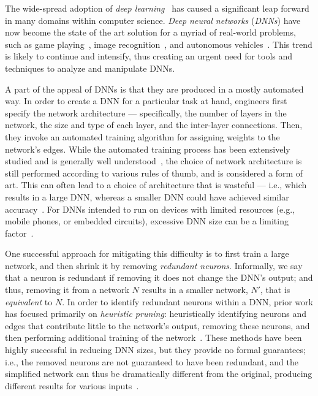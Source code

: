 \documentclass[10pt, conference, twocolumn, compsocconf]{IEEEtran}
\theoremstyle{remark}
\begin{document}
The wide-spread adoption of \emph{deep learning}~\cite{GoBeCo16} has
caused a significant leap forward in many domains within computer
science.  \emph{Deep neural networks} (\emph{DNNs}) have now become
the state of the art solution for a myriad of real-world problems,
such as game playing~\cite{SiHuMaGuSiVaScAnPaLaDi16}, image
recognition~\cite{SiZi14}, and autonomous
vehicles~\cite{BoDeDwFiFlGoJaMoMuZhZhZhZi16,JuLoBrOwKo16}. This trend
is likely to continue and intensify, thus creating an urgent need for
tools and techniques to analyze and manipulate DNNs.

A part of the appeal of DNNs is that they are produced in a mostly
automated way.  In order to create a DNN for a particular task at
hand, engineers first specify the network architecture ---
specifically, the number of layers in the network, the size and type
of each layer, and the inter-layer connections. Then, they invoke an
automated training algorithm for assigning weights to the network's
edges\cite{GoBeCo16}. While the automated training process has been
extensively studied and is generally well understood~\cite{GoBeCo16},
the choice of network architecture is still performed according to
various rules of thumb, and is considered a form of art. This can
often lead to a choice of architecture that is wasteful --- i.e.,
which results in a large DNN, whereas a smaller DNN could have
achieved similar
accuracy~\cite{GoFeMaBaKa20,HaMaDa15,IaHaMoAsDaKe16}. For DNNs
intended to run on devices with limited resources (e.g., mobile
phones, or embedded circuits), excessive DNN size can be a limiting
factor~\cite{JuLoBrOwKo16}.

One successful approach for mitigating this difficulty is to first
train a large network, and then shrink it by removing \emph{redundant
  neurons}.  Informally, we say that a neuron is redundant if removing
it does not change the DNN's output; and thus, removing
it from a network $N$ results in a smaller network, $N'$, that is
\emph{equivalent} to $N$.  In order to identify redundant neurons within a
DNN, prior work has focused primarily on \emph{heuristic pruning}:
heuristically identifying neurons and edges that contribute little to
the network's output, removing these neurons, and then performing
additional training of the
network~\cite{HaMaDa15,IaHaMoAsDaKe16}. These methods have been highly
successful in reducing DNN sizes, but they provide no formal
guarantees; i.e., the removed neurons are not guaranteed to have been
redundant, and the simplified network can thus be dramatically
different from the original, producing different results for various
inputs~\cite{liebenwein2021lost}.
\end{document}
